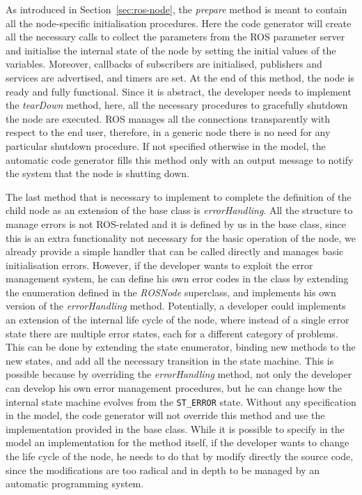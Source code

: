 As introduced in Section~\ref{sec:ros-node}, the \textit{prepare} method is meant to contain all the node-specific initialisation procedures. Here the code generator will create all the necessary calls to collect the parameters from the ROS parameter server and initialise the internal state of the node by setting the initial values of the variables. Moreover, callbacks of subscribers are initialised, publishers and services are advertised, and timers are set. At the end of this method, the node is ready and fully functional. Since it is abstract, the developer needs to implement the \textit{tearDown} method, here, all the necessary procedures to gracefully shutdown the node are executed. ROS manages all the connections transparently with respect to the end user, therefore, in a generic node there is no need for any particular shutdown procedure. If not specified otherwise in the model, the automatic code generator fills this method only with an output message to notify the system that the node is shutting down.

The last method that is necessary to implement to complete the definition of the child node as an extension of the base class is \textit{errorHandling}. All the structure to manage errors is not ROS-related and it is defined by us in the base class, since this is an extra functionality not necessary for the basic operation of the node, we already provide a simple handler that can be called directly and manages basic initialisation errors. However, if the developer wants to exploit the error management system, he can define his own error codes in the class by extending the enumeration defined in the \textit{ROSNode} superclass, and implements his own version of the \textit{errorHandling} method. Potentially, a developer could implements an extension of the internal life cycle of the node, where instead of a single error state there are multiple error states, each for a different category of problems. This can be done by extending the state enumerator, binding new methods to the new states, and add all the necessary transition in the state machine. This is possible because by overriding the \textit{errorHandling} method, not only the developer can develop his own error management procedures, but he can change how the internal state machine evolves from the \texttt{ST\_ERROR} state. Without any specification in the model, the code generator will not override this method and use the implementation provided in the base class. While it is possible to specify in the model an implementation for the method itself, if the developer wants to change the life cycle of the node, he needs to do that by modify directly the source code, since the modifications are too radical and in depth to be managed by an automatic programming system.

